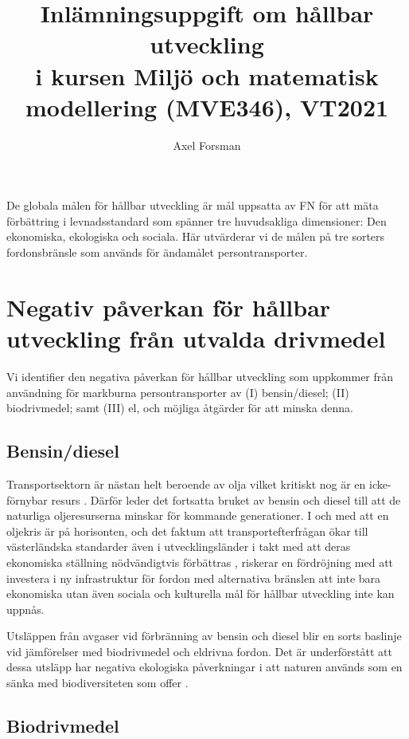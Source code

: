 \documentclass{article}
\title{Inlämningsuppgift om hållbar utveckling\\ i kursen Miljö och matematisk modellering (MVE346), VT2021}
\author{Axel Forsman}
\begin{document}
\maketitle

De globala målen för hållbar utveckling är mål uppsatta av FN
för att mäta förbättring i levnadsstandard
som spänner tre huvudsakliga dimensioner: Den ekonomiska, ekologiska och sociala.
Här utvärderar vi de målen på tre sorters fordonsbränsle som används
för ändamålet persontransporter.

\section{Negativ påverkan för hållbar utveckling från utvalda drivmedel}

Vi identifier den negativa påverkan för hållbar utveckling
som uppkommer från användning för markburna persontransporter av
(I) bensin/diesel; (II) biodrivmedel; samt (III) el,
och möjliga åtgärder för att minska denna.

\subsection{Bensin/diesel}

Transportsektorn är nästan helt beroende av olja vilket kritiskt nog är
en icke-förnybar resurs \autocite{gudmundsson96}.
Därför leder det fortsatta bruket av bensin och diesel till att
de naturliga oljeresurserna minskar för kommande generationer.
I och med att en oljekris är på horisonten, och det faktum att
transportefterfrågan ökar till västerländska standarder även i utvecklingsländer
i takt med att deras ekonomiska ställning nödvändigtvis förbättras \autocite{edenhofer15},
riskerar en fördröjning med att investera i ny infrastruktur för
fordon med alternativa bränslen
att inte bara ekonomiska utan även sociala och kulturella mål
för hållbar utveckling inte kan uppnås.

Utsläppen från avgaser vid förbränning av bensin och diesel
blir en sorts baslinje vid jämförelser med biodrivmedel och eldrivna fordon.
Det är underförstått att dessa utsläpp har negativa ekologiska påverkningar
i att naturen används som en sänka med biodiversiteten som offer \autocite{gudmundsson96}.

\subsection{Biodrivmedel}
\end{document}

